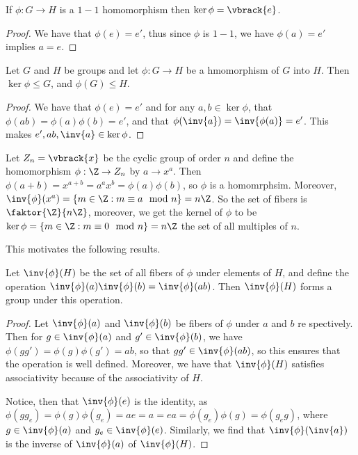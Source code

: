 \begin{lemma}\label{3.1.1}
    If $\phi:G \rightarrow H$ is a $1-1$ homomorphism then $\ker{\phi}=\vbrack{e}$.
\end{lemma}
\begin{proof}
    We have that $\phi(e)=e'$, thus since $\phi$ is $1-1$, we have $\phi(a)=e'$
    implies $a=e$.
\end{proof}

\begin{lemma}\label{3.1.2}
    Let $G$ and  $H$ be groups and let  $\phi:G \rightarrow H$ be a hmomorphism
    of $G$ into  $H$. Then $\ker{\phi} \leq G$, and $\phi(G) \leq H$.
\end{lemma}
\begin{proof}
    We have that $\phi(e)=e'$ and for any $a,b \in \ker{\phi}$, that
    $\phi(ab)=\phi(a)\phi(b)=e'$, and that $\phi(\inv{a})=\inv{\phi(a)}=e'$.
    This makes $e',ab, \inv{a} \in \ker{\phi}$.
\end{proof}

\begin{example}\label{3.1}
    Let $Z_n=\vbrack{x}$ be the cyclic group of order $n$ and define the
    homomorphism  $\phi:\Z \rightarrow Z_n$ by $a \rightarrow x^a$. Then
    $\phi(a+b)=x^{a+b}=a^ax^b=\phi(a)\phi(b)$, so $\phi$ is a homomrphsim.
    Moreover,  $\inv{\phi}(x^a)=\{m \in \Z : m \equiv a \mod{n}\}=n\Z$. So the
    set of fibers is $\faktor{\Z}{n\Z}$, moreover, we get the kernel of $\phi$
    to be  $\ker{\phi}=\{m \in \Z : m \equiv 0 \mod{n}\}=n\Z$ the set of all
    multiples of $n$.
\end{example}

This motivates the following results.

\begin{theorem}\label{3.1.3}
    Let $\inv{\phi}(H)$ be the set of all fibers of $\phi$ under elements of
    $H$, and define the operation $\inv{\phi}(a)\inv{\phi}(b)=\inv{\phi}(ab)$.
    Then $\inv{\phi}(H)$ forms a group under this operation.
\end{theorem}
\begin{proof}
    Let $\inv{\phi}(a)$ and $\inv{\phi}(b)$ be fibers of  $\phi$ under  $a$ and
     $b$ re spectively. Then for $g \in \inv{\phi}(a)$ and  $g' \in
     \inv{\phi}(b)$, we have  $\phi(gg')=\phi(g)\phi(g')=ab$, so that $gg' \in
     \inv{\phi}(ab)$, so this ensures that the operation is well defined.
     Moreover, we have that $\inv{\phi}(H)$ satisfies associativity because of
     the associativity of  $H$.

     Notice, then that  $\inv{\phi}(e)$ is the identity, as
     $\phi(gg_e)=\phi(g)\phi(g_e)=ae=a=ea=\phi(g_e)\phi(g)=\phi(g_eg)$, where $g
     \in \inv{\phi}(a)$ and $g_e \in \inv{\phi}(e)$. Similarly, we find that
     $\inv{\phi}(\inv{a})$ is the inverse of $\inv{\phi}(a)$ of $\inv{\phi}(H)$.
\end{proof}

